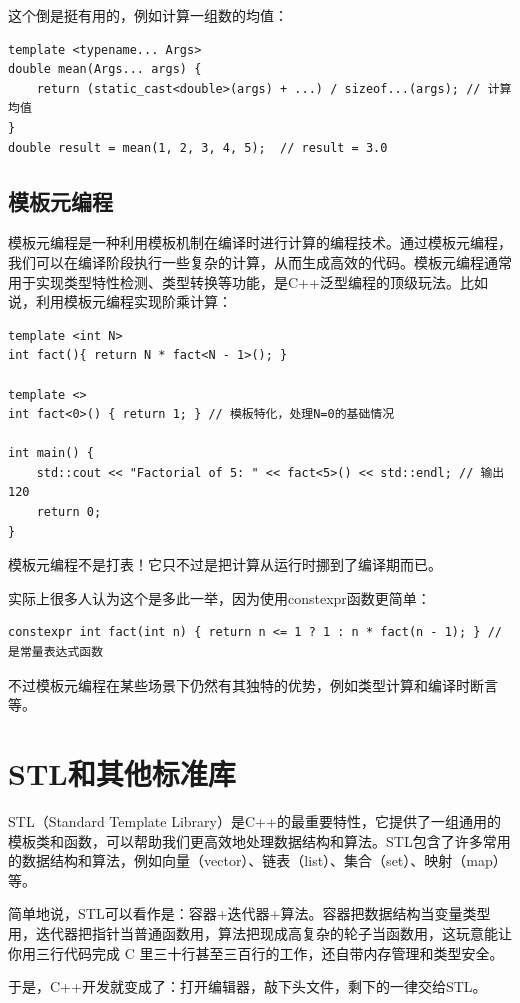 这个倒是挺有用的，例如计算一组数的均值：
\begin{verbatim}
template <typename... Args>
double mean(Args... args) {
    return (static_cast<double>(args) + ...) / sizeof...(args); // 计算均值
}
double result = mean(1, 2, 3, 4, 5);  // result = 3.0
\end{verbatim}

\subsection{模板元编程}

模板元编程是一种利用模板机制在编译时进行计算的编程技术。通过模板元编程，我们可以在编译阶段执行一些复杂的计算，从而生成高效的代码。模板元编程通常用于实现类型特性检测、类型转换等功能，是C++泛型编程的顶级玩法。比如说，利用模板元编程实现阶乘计算：
\begin{verbatim}
template <int N>
int fact(){ return N * fact<N - 1>(); }

template <>
int fact<0>() { return 1; } // 模板特化，处理N=0的基础情况

int main() {
    std::cout << "Factorial of 5: " << fact<5>() << std::endl; // 输出120
    return 0;
}
\end{verbatim}
模板元编程不是打表！它只不过是把计算从运行时挪到了编译期而已。

实际上很多人认为这个是多此一举，因为使用constexpr函数更简单：
\begin{verbatim}
constexpr int fact(int n) { return n <= 1 ? 1 : n * fact(n - 1); } // 是常量表达式函数
\end{verbatim}
不过模板元编程在某些场景下仍然有其独特的优势，例如类型计算和编译时断言等。

\section{STL和其他标准库}

STL（Standard Template Library）是C++的最重要特性，它提供了一组通用的模板类和函数，可以帮助我们更高效地处理数据结构和算法。STL包含了许多常用的数据结构和算法，例如向量（vector）、链表（list）、集合（set）、映射（map）等。

简单地说，STL可以看作是：容器+迭代器+算法。容器把数据结构当变量类型用，迭代器把指针当普通函数用，算法把现成高复杂的轮子当函数用，这玩意能让你用三行代码完成 C 里三十行甚至三百行的工作，还自带内存管理和类型安全。

于是，C++开发就变成了：打开编辑器，敲下头文件，剩下的一律交给STL。

